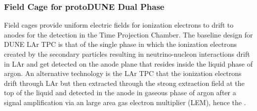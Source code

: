 \subsubsection{Field Cage for protoDUNE Dual Phase}
Field cages provide uniform electric fields for ionization electrons to drift to anodes for the detection in the Time Projection Chamber.
The baseline design for DUNE LAr TPC is that of the single phase in which the ionization electrons created by the secondary particles 
resulting in neutrino-nucleon interactions drift in LAr and get detected on the anode plane that resides inside the liquid phase of argon.
An alternative technology is the LAr TPC that the ionization electrons drift through LAr but then extracted through the strong extraction
field at the top of the liquid and detected in the anode in gaseous phase of argon after a signal amplification via an large area gas electron 
multiplier (LEM), hence the .

